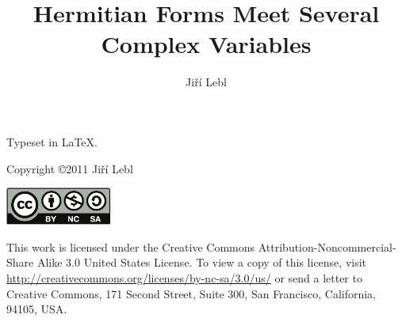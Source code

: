 \documentclass[12pt,openany]{book}
\author{Ji\v{r}\'i Lebl}
\title{Hermitian Forms Meet Several Complex Variables}
\theoremstyle{plain}
\theoremstyle{remark}
\theoremstyle{definition}
\theoremstyle{exercise}
\theoremstyle{example}
\begin{document}
\ifpdf
\fi
\newlength{\centeroffset}
\setlength{\centeroffset}{-0.5\oddsidemargin}
\addtolength{\centeroffset}{0.5\evensidemargin}
\thispagestyle{empty}
\noindent\hspace*{\centeroffset}

\noindent\hspace*{\centeroffset}



\pagebreak

\vspace*{\fill}

\noindent
Typeset in \LaTeX.

\bigskip

\noindent
Copyright \copyright 2011 Ji{\v r}\'i Lebl

\bigskip

\noindent
\includegraphics[width=1.38in]{license}

\bigskip

\noindent
This work is licensed under the Creative Commons
Attribution-Non\-commercial-Share Alike 3.0 United States License. To view a
copy of this license, visit
\url{http://creativecommons.org/licenses/by-nc-sa/3.0/us/} or send a letter to
Creative Commons, 171 Second Street, Suite 300, San Francisco, California,
94105, USA.
\end{document}
